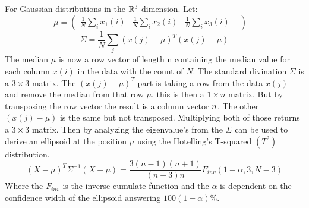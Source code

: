 \par For Gaussian distributions in the $\mathbb{R}^3$ dimension.
Let:
\begin{equation}
    \mu = \begin{pmatrix}
        \frac{1}{N}\sum_i{x_1(i)} &
        \frac{1}{N}\sum_i{x_2(i)} &
        \frac{1}{N}\sum_i{x_3(i)} &
    \end{pmatrix}
    \quad
\end{equation}
\begin{equation}
    \Sigma = \frac{1}{N} \sum_j{(x(j) - \mu)^T(x(j) - \mu)}
\end{equation}
The median $\mu$ is now a row vector of length n containing the median value for each column $x(i)$ in the data with the count of $N$.
The standard divination $\Sigma$ is a $3\times 3$ matrix.
The $(x(j) - \mu)^T$ part is taking a row from the data $x(j)$ and remove the median from that row $\mu$, this is then a $1\times n$ matrix.
But by transposing the row vector the result is a column vector $n \time 1$.
The other $(x(j) - \mu)$ is the same but not transposed.
Multiplying both of those returns a $3\times 3$ matrix.
Then by analyzing the eigenvalue's from the $\Sigma$ can be used to derive an ellipsoid at the position $\mu$ using the Hotelling's T-squared
$(T^2)$ distribution.
\begin{equation}
    (X - \mu)^T\Sigma^{-1}(X - \mu)=\frac{3(n-1)(n+1)}{(n-3)n} F_{inv}(1-\alpha, 3, N - 3)
\end{equation}
Where the $F_{inv}$ is the inverse cumulate function and the $\alpha$ is dependent on the confidence width of the ellipsoid answering $100(1-\alpha)\%$.



